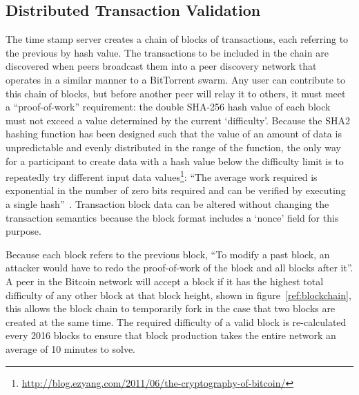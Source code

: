 \subsection{Distributed Transaction Validation}
The time stamp server creates a chain of blocks of transactions, each referring to the previous by hash value.  The transactions to be included in the chain are discovered when peers broadcast them into a peer discovery network that operates in a similar manner to a BitTorrent swarm.  Any user can contribute to this chain of blocks, but before another peer will relay it to others, it must meet a ``proof-of-work'' requirement: the double SHA-256 hash value of each block must not exceed a value determined by the current `difficulty'.  Because the SHA2 hashing function has been designed such that the value of an amount of data is unpredictable and evenly distributed in the range of the function, the only way for a participant to create data with a hash value below the difficulty limit is to repeatedly try different input data values\footnote{\url{http://blog.ezyang.com/2011/06/the-cryptography-of-bitcoin/}}: ``The average work required is exponential in the number of zero bits required and can be verified by executing a single hash''~\cite{satoshi}. Transaction block data can be altered without changing the transaction semantics because the block format includes a `nonce' field for this purpose.

Because each block refers to the previous block, ``To modify a past block, an attacker would have to redo the proof-of-work of the block and all blocks after it''.  A peer in the Bitcoin network will accept a block if it has the highest total difficulty of any other block at that block height, shown in figure~\ref{ref:blockchain}, this allows the block chain to temporarily fork in the case that two blocks are created at the same time. The required difficulty of a valid block is re-calculated every 2016 blocks to ensure that block production takes the entire network an average of 10 minutes to solve.

